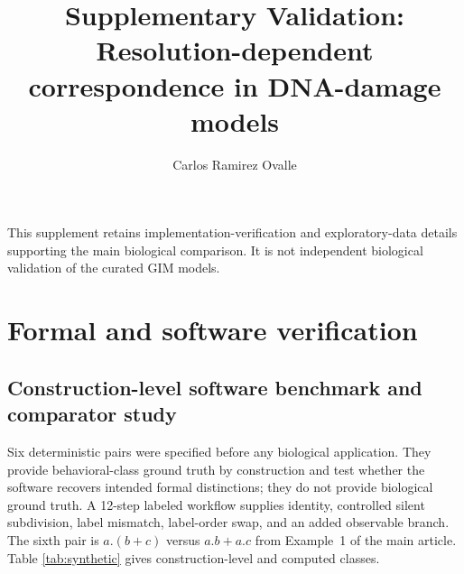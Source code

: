 \documentclass{ws-jbcb}
\numberwithin{equation}{section}
\begin{document}
\catchline{}{}{}{}{}
\title{Supplementary Validation: Resolution-dependent correspondence in DNA-damage models}
\author{Carlos Ramirez Ovalle}
\address{Pontificia Universidad Javeriana Cali, Colombia}
\date{}
\maketitle
This supplement retains implementation-verification and exploratory-data
details supporting the main biological comparison. It is not independent
biological validation of the curated GIM models.

\section{Formal and software verification}
\label{sec:computational-validation}

\subsection{Construction-level software benchmark and comparator study}
\label{sec:benchmark-method}

Six deterministic pairs were specified before any biological application. They
provide behavioral-class ground truth by construction and test whether the
software recovers intended formal distinctions; they do not provide biological
ground truth. A
12-step labeled workflow supplies identity, controlled silent subdivision, label
mismatch, label-order swap, and an added observable branch. The sixth pair is
$a.(b+c)$ versus $a.b+a.c$ from Example~1 of the main article. Table
\ref{tab:synthetic} gives construction-level and computed classes.

\begin{table}[t]
\end{table}
\end{document}
